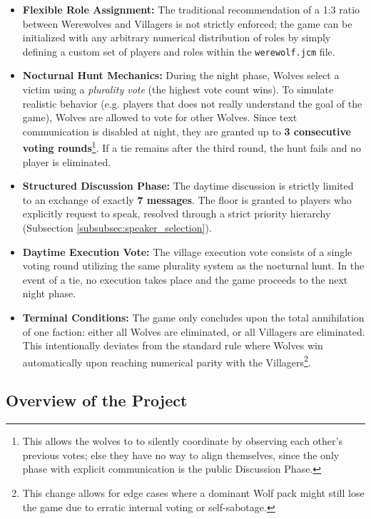 \begin{itemize}
    \item \textbf{Flexible Role Assignment:} The traditional recommendation of a 1:3 ratio between Werewolves and Villagers is not strictly enforced; the game can be initialized with any arbitrary numerical distribution of roles by simply defining a custom set of players and roles within the \texttt{werewolf.jcm} file.
    
    \item \textbf{Nocturnal Hunt Mechanics:} During the night phase, Wolves select a victim using a \emph{plurality vote} (the highest vote count wins). To simulate realistic behavior (e.g. players that does not really understand the goal of the game), Wolves are allowed to vote for other Wolves. Since text communication is disabled at night, they are granted up to \textbf{3 consecutive voting rounds}\footnote{This allows the wolves to to silently coordinate by observing each other's previous votes; else they have no way to align themselves, since the only phase with explicit communication is the public Discussion Phase.}. If a tie remains after the third round, the hunt fails and no player is eliminated.
    
    \item \textbf{Structured Discussion Phase:} The daytime discussion is strictly limited to an exchange of exactly  \textbf{7 messages}. The floor is granted to players who explicitly request to speak, resolved through a strict priority hierarchy (Subsection \ref{subsubsec:speaker_selection}).

    
    \item \textbf{Daytime Execution Vote:} The village execution vote consists of a single voting round utilizing the same plurality system as the nocturnal hunt. In the event of a tie, no execution takes place and the game proceeds to the next night phase.
    
    \item \textbf{Terminal Conditions:} The game only concludes upon the total annihilation of one faction: either all Wolves are eliminated, or all Villagers are eliminated. This intentionally deviates from the standard rule where Wolves win automatically upon reaching numerical parity with the Villagers\footnote{This change allows for edge cases where a dominant Wolf pack might still lose the game due to erratic internal voting or self-sabotage.}.
\end{itemize}

\subsection{Overview of the Project}
\label{subsec:overview}

